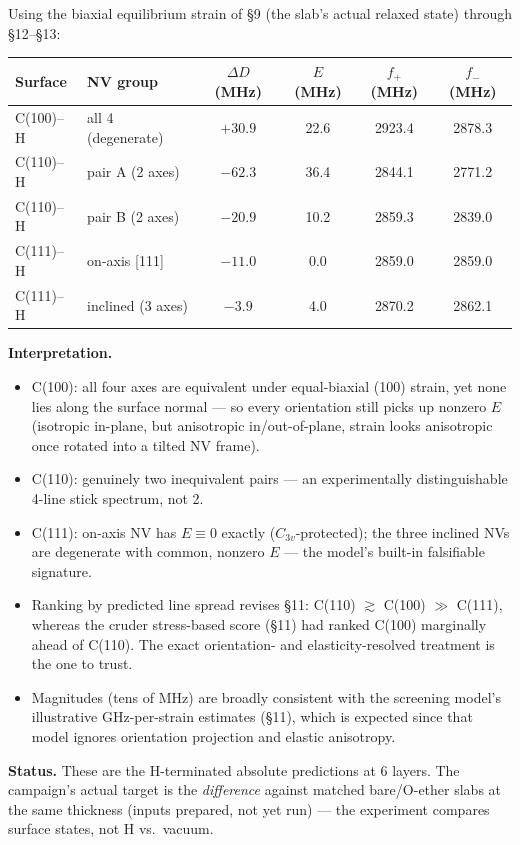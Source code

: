 \documentclass[11pt]{article}
\begin{document}
Using the biaxial equilibrium strain of \S9 (the slab's actual relaxed state) through \S12--\S13:

\begin{center}
\begin{tabular}{llcccc}
\toprule
Surface & NV group & $\Delta D$ (MHz) & $E$ (MHz) & $f_+$ (MHz) & $f_-$ (MHz) \\
\midrule
C(100)--H & all 4 (degenerate) & $+30.9$ & 22.6 & 2923.4 & 2878.3 \\
C(110)--H & pair A (2 axes) & $-62.3$ & 36.4 & 2844.1 & 2771.2 \\
C(110)--H & pair B (2 axes) & $-20.9$ & 10.2 & 2859.3 & 2839.0 \\
C(111)--H & on-axis [111] & $-11.0$ & 0.0 & 2859.0 & 2859.0 \\
C(111)--H & inclined (3 axes) & $-3.9$ & 4.0 & 2870.2 & 2862.1 \\
\bottomrule
\end{tabular}
\end{center}

\textbf{Interpretation.}
\begin{itemize}
  \item C(100): all four axes are equivalent under equal-biaxial (100) strain, yet none lies along the surface normal --- so every orientation still picks up nonzero $E$ (isotropic in-plane, but anisotropic in/out-of-plane, strain looks anisotropic once rotated into a tilted NV frame).
  \item C(110): genuinely two inequivalent pairs --- an experimentally distinguishable 4-line stick spectrum, not 2.
  \item C(111): on-axis NV has $E \equiv 0$ exactly ($C_{3v}$-protected); the three inclined NVs are degenerate with common, nonzero $E$ --- the model's built-in falsifiable signature.
  \item Ranking by predicted line spread revises \S11: C(110) $\gtrsim$ C(100) $\gg$ C(111), whereas the cruder stress-based score (\S11) had ranked C(100) marginally ahead of C(110). The exact orientation- and elasticity-resolved treatment is the one to trust.
  \item Magnitudes (tens of MHz) are broadly consistent with the screening model's illustrative GHz-per-strain estimates (\S11), which is expected since that model ignores orientation projection and elastic anisotropy.
\end{itemize}

\textbf{Status.} These are the H-terminated absolute predictions at 6 layers. The campaign's actual target is the \textit{difference} against matched bare/O-ether slabs at the same thickness (inputs prepared, not yet run) --- the experiment compares surface states, not H vs.\ vacuum.
\end{document}
